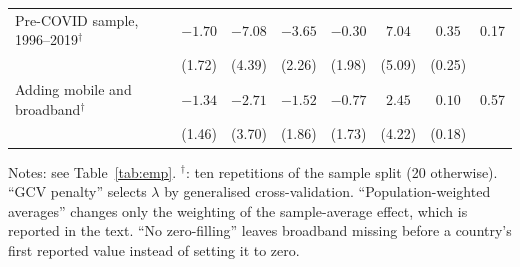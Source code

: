 \documentclass[pdflatex,sn-basic]{sn-jnl}%
\theoremstyle{thmstyleone}
\theoremstyle{thmstyletwo}
\renewenvironment{table}[1][]{\begin{tableorg}[#1]\centering\tablebodyfont}{\end{tableorg}}
\begin{document}
\begin{appendices}
\begin{table}[!p]
{\begin{threeparttable}
\begin{tabular}{lccccccc}
\quad Pre-COVID sample, 1996--2019$^{\dagger}$ & $-1.70$ & $-7.08$ & $-3.65$ & $-0.30$ & $7.04$ & $0.35$ & 0.17\\
 & (1.72) & (4.39) & (2.26) & (1.98) & (5.09) & (0.25) & \\
\quad Adding mobile and broadband$^{\dagger}$ & $-1.34$ & $-2.71$ & $-1.52$ & $-0.77$ & $2.45$ & $0.10$ & 0.57\\
 & (1.46) & (3.70) & (1.86) & (1.73) & (4.22) & (0.18) & \\
\bottomrule
\end{tabular}
\begin{tablenotes}\scriptsize
\item Notes: see Table~\ref{tab:emp}. $^{\dagger}$: ten repetitions of the sample split (20 otherwise). ``GCV penalty'' selects $\lambda$ by generalised cross-validation. ``Population-weighted averages'' changes only the weighting of the sample-average effect, which is reported in the text. ``No zero-filling'' leaves broadband missing before a country's first reported value instead of setting it to zero.
\end{tablenotes}
\end{threeparttable}}
\end{table}
\end{appendices}


\end{document}
